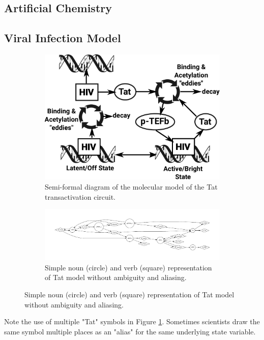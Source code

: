 \documentclass[11pt]{article}
\begin{document}
\subsection{Artificial Chemistry}

\subsection{Viral Infection Model}

\begin{figure}
\begin{subfigure}[b]{\textwidth}
\includegraphics[width=\textwidth]{figs/HIV-Tat-figure.pdf}
\caption{Semi-formal diagram of the molecular model of the Tat transactivation circuit.}
\label{Fig:HIV-Tat}
\end{subfigure}
\begin{subfigure}[b]{\textwidth}
\includegraphics[width=\textwidth]{figs/TatModel.pdf}
\caption{Simple noun (circle) and verb (square) representation of Tat model without ambiguity and aliasing.}
\label{Fig:HIV-Tat-VDSOL}
\end{subfigure}
\end{figure}

Note the use of multiple "Tat" symbols in Figure \ref{Fig:HIV-Tat}. Sometimes scientists draw the same symbol multiple places as an "alias" for the same underlying state variable.
\end{document}
